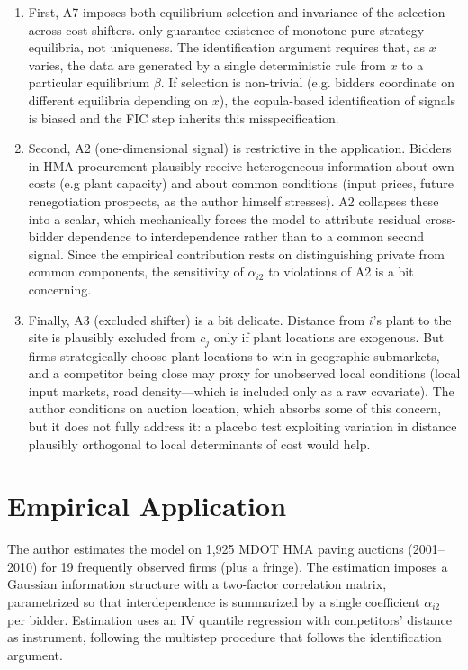 \documentclass{article}
\begin{document}
\begin{enumerate}
    \item First, A7 imposes both equilibrium selection and invariance of the selection across cost shifters. \citet{RenyZamir2004} only guarantee existence of monotone pure-strategy equilibria, not uniqueness. The identification argument requires that, as $x$ varies, the data are generated by a single deterministic rule from $x$ to a particular equilibrium $\beta$. If selection is non-trivial (e.g. bidders coordinate on different equilibria depending on $x$), the copula-based identification of signals is biased and the FIC step inherits this misspecification.
    \item Second, A2 (one-dimensional signal) is restrictive in the application. Bidders in HMA procurement plausibly receive heterogeneous information about own costs (e.g plant capacity) and about common conditions (input prices, future renegotiation prospects, as the author himself stresses). A2 collapses these into a scalar, which mechanically forces the model to attribute residual cross-bidder dependence to interdependence rather than to a common second signal. Since the empirical contribution rests on distinguishing private from common components, the sensitivity of $\alpha_{i2}$ to violations of A2 is a bit concerning.
    \item Finally, A3 (excluded shifter) is a bit delicate. Distance from $i$'s plant to the site is plausibly excluded from $c_j$ only if plant locations are exogenous. But firms strategically choose plant locations to win in geographic submarkets, and a competitor being close may proxy for unobserved local conditions (local input markets, road density---which is included only as a raw covariate). The author conditions on auction location, which absorbs some of this concern, but it does not fully address it: a placebo test exploiting variation in distance plausibly orthogonal to local determinants of cost would help.

\end{enumerate}



\section{Empirical Application}
\label{section3}
The author estimates the model on 1{,}925 MDOT HMA paving auctions (2001--2010) for 19 frequently observed firms (plus a fringe). The estimation imposes a Gaussian information structure with a two-factor correlation matrix, parametrized so that interdependence is summarized by a single coefficient $\alpha_{i2}$ per bidder. Estimation uses an IV quantile regression with competitors' distance as instrument, following the multistep procedure that follows the identification argument.
\end{document}
